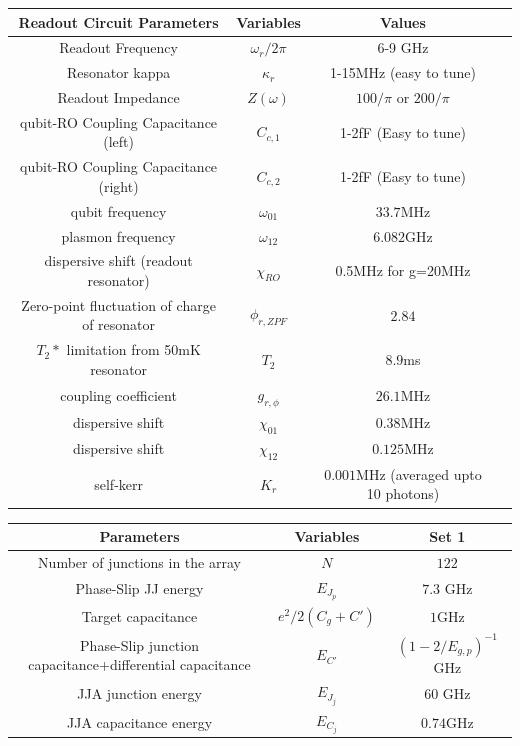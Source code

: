 \documentclass[%
reprint,
superscriptaddress,
 amsmath,amssymb,
 aps,
 prx,
longbibliography,
floatfix,
]{revtex4-2}
\begin{document}
\begin{table}[htb]
\begin{center}
\begin{tabular}{|c |c| c |c| }
 \hline
 \textbf{Readout Circuit Parameters} & \textbf{Variables} & \textbf{Values}\\ 
\hline
Readout Frequency&$\omega_r/2\pi$ &6-9 GHz\\
 \hline
 Resonator kappa&$\kappa_r$ &1-15MHz (easy to tune)\\
 \hline
Readout Impedance & $Z(\omega)$ & $100/\pi$ or $200/\pi$\\
 \hline
 qubit-RO Coupling Capacitance (left) &$C_{c,1}$ &1-2fF (Easy to tune)\\
 \hline
 qubit-RO Coupling Capacitance (right) &$C_{c,2}$ &1-2fF (Easy to tune)\\
 \hline
qubit frequency &$\omega_{01}$&$33.7$MHz\\ 
 \hline
plasmon frequency &$\omega_{12}$&$6.082$GHz\\ 
 \hline
dispersive shift (readout resonator) &$\chi_{RO}$&0.5MHz for g=20MHz\\ 
 \hline
Zero-point fluctuation of charge of resonator &$\phi_{r,ZPF}$&$2.84$\\
 \hline
$T_2*$ limitation from 50mK resonator &$T_2$&$8.9$ms\\
 \hline
coupling coefficient &$g_{r,\phi}$&$26.1$MHz\\
 \hline
dispersive shift &$\chi_{01}$&$0.38$MHz\\
 \hline
dispersive shift &$\chi_{12}$&$0.125$MHz\\
 \hline
self-kerr &$K_r$&$0.001$MHz (averaged upto 10 photons)\\
 \hline
 \end{tabular}
\end{center}
\begin{center}
\begin{tabular}{|c |c |c|}
 \hline
\textbf{Parameters}&\textbf{Variables} &Set 1\\ 
 \hline
Number of junctions in the array&$N$ &$122$\\ 
 \hline
Phase-Slip JJ energy&$E_{J_p}$ &$7.3$ GHz\\ 
\hline
Target capacitance&$e^2/2(C_g+C')$ &$1$GHz\\ 
\hline
Phase-Slip junction capacitance+differential capacitance &$E_{C'}$ &$(1-2/E_{g,p})^{-1}$GHz\\ 
\hline
JJA junction energy&$E_{J_j}$&60 GHz\\ 
\hline
JJA capacitance energy&$E_{C_j}$&$0.74$GHz\\ 

\end{tabular}
\end{center}
\end{table}
\end{document}
